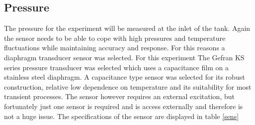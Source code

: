 \documentclass[paper=a4, fontsize=11pt, abstract=on]{scrartcl}
\numberwithin{equation}{section}		%
\numberwithin{figure}{section}			%
\numberwithin{table}{section}				%
\begin{document}
\subsection{Pressure}
The pressure for the experiment will be measured at the inlet of the tank. Again the sensor needs to  be able to cope with high pressures and temperature fluctuations while maintaining accuracy and response. For this reasons a diaphragm transducer sensor was selected. For this experiment The Gefran KS series pressure transducer was selected which uses a capacitance film on a stainless steel diaphragm. A capacitance type sensor was selected for its robust construction, relative low dependence on temperature and its suitability for most transient processes. The sensor however requires an external excitation, but fortunately just one sensor is required and is access externally and therefore is not a huge issue. The specifications of the sensor are displayed in table \ref{sens}
\end{document}
